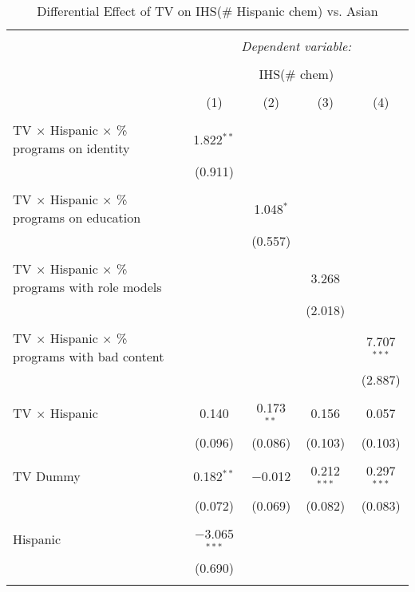 
\begin{table}[!htbp] \centering 
  \caption{Differential Effect of TV on IHS(\# Hispanic chem) vs. Asian} 
  \label{} 
\begin{tabular}{@{\extracolsep{-2pt}}lcccc} 
\\[-1.8ex]\hline 
\hline \\[-1.8ex] 
 & \multicolumn{4}{c}{\textit{Dependent variable:}} \\ 
\cline{2-5} 
\\[-1.8ex] & \multicolumn{4}{c}{IHS(\# chem)} \\ 
\\[-1.8ex] & (1) & (2) & (3) & (4)\\ 
\hline \\[-1.8ex] 
 TV $\times$ Hispanic $\times$ \% programs on identity & 1.822$^{**}$ &  &  &  \\ 
  & (0.911) &  &  &  \\ 
  & & & & \\ 
 TV $\times$ Hispanic $\times$ \% programs on education &  & 1.048$^{*}$ &  &  \\ 
  &  & (0.557) &  &  \\ 
  & & & & \\ 
 TV $\times$ Hispanic $\times$ \% programs with role models &  &  & 3.268 &  \\ 
  &  &  & (2.018) &  \\ 
  & & & & \\ 
 TV $\times$ Hispanic $\times$ \% programs with bad content &  &  &  & 7.707$^{***}$ \\ 
  &  &  &  & (2.887) \\ 
  & & & & \\ 
 TV $\times$ Hispanic & 0.140 & 0.173$^{**}$ & 0.156 & 0.057 \\ 
  & (0.096) & (0.086) & (0.103) & (0.103) \\ 
  & & & & \\ 
 TV Dummy & 0.182$^{**}$ & $-$0.012 & 0.212$^{***}$ & 0.297$^{***}$ \\ 
  & (0.072) & (0.069) & (0.082) & (0.083) \\ 
  & & & & \\ 
 Hispanic & $-$3.065$^{***}$ &  &  &  \\ 
  & (0.690) &  &  &  \\ 
  & & & & \\ 

\end{tabular}
\end{table}
